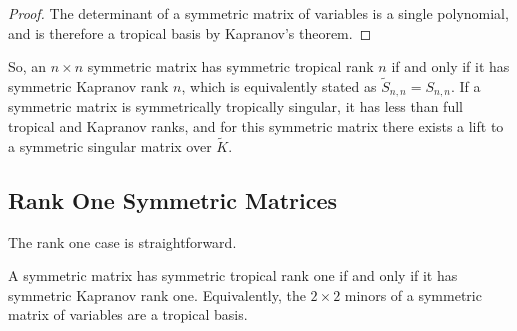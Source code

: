 \documentclass{article}
\begin{document}
\begin{proof}
  The determinant of a symmetric matrix of variables is a single polynomial, and is therefore a tropical basis by Kapranov's theorem.
\end{proof}

So, an $n \times n$ symmetric matrix has symmetric tropical rank $n$ if and only if it has symmetric Kapranov rank $n$, which is equivalently stated as $\tilde{S}_{n,n} = S_{n,n}$. If a symmetric matrix is symmetrically tropically singular, it has less than full tropical and Kapranov ranks, and for this symmetric matrix there exists a lift to a symmetric singular matrix over $\tilde{K}$. 

\subsection{Rank One Symmetric Matrices}

The rank one case is straightforward.

\begin{thm}
  A symmetric matrix has symmetric tropical rank one if and only if it has symmetric Kapranov rank one. Equivalently, the $2 \times 2$ minors of a symmetric matrix of variables are a tropical basis.
\end{thm}
\end{document}
